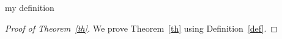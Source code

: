 \begin{definition}
	\label{def}
	my definition
\end{definition}

\begin{theorem}
	\label{th}
\end{theorem}

\begin{proof}[Proof of Theorem~\ref{th}]
	We prove Theorem~\ref{th} using Definition~\ref{def}.
\end{proof}